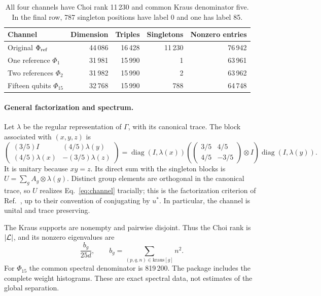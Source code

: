 \documentclass[11pt]{article}
\begin{document}
\begin{table}[ht]
\centering
\small
\begin{tabular}{@{}lrrrr@{}}
\toprule
Channel & Dimension & Triples & Singletons & Nonzero entries\\
\midrule
Original $\Phi_{\mathrm{ref}}$ & 44\,086 & 16\,428 & 11\,230 & 76\,942\\
One reference $\Phi_1$ & 31\,981 & 15\,990 & 1 & 63\,961\\
Two references $\Phi_2$ & 31\,982 & 15\,990 & 2 & 63\,962\\
Fifteen qubits $\Phi_{15}$ & 32\,768 & 15\,990 & 788 & 64\,748\\
\bottomrule
\end{tabular}
\caption{All four channels have Choi rank 11\,230 and common Kraus denominator five.
In the final row, 787 singleton positions have label 0 and one has label 85.}
\label{tab:instances}
\end{table}

\paragraph{General factorization and spectrum.}
Let $\lambda$ be the regular representation of $\Gamma$, with its canonical trace. The
block associated with $(x,y,z)$ is
\begin{equation}
 \begin{pmatrix}(3/5)I&(4/5)\lambda(y)\\(4/5)\lambda(x)&-(3/5)\lambda(z)\end{pmatrix}
 =\operatorname{diag}(I,\lambda(x))
 \left(\begin{pmatrix}3/5&4/5\\4/5&-3/5\end{pmatrix}\otimes I\right)
 \operatorname{diag}(I,\lambda(y)).\label{eq:unitary-block}
\end{equation}
It is unitary because $xy=z$. Its direct sum with the singleton blocks is
$U=\sum_gA_g\otimes\lambda(g)$. Distinct group elements are orthogonal in the canonical
trace, so $U$ realizes Eq.~\eqref{eq:channel} tracially; this is the factorization
criterion of Ref.~\cite[Theorem~2.2]{hm11}, up to their convention of conjugating by $u^*$. In particular, the channel is unital and trace
preserving.

The Kraus supports are nonempty and pairwise disjoint. Thus the Choi rank is $|\mathcal L|$, and
its nonzero eigenvalues are
\begin{equation}
 \frac{b_g}{25d},\qquad
 b_g=\sum_{(p,q,n)\in\mathrm{kraus}[g]}n^2.
 \label{eq:choi-spectrum}
\end{equation}
For $\Phi_{15}$ the common spectral denominator is 819\,200. The package includes the
complete weight histograms. These are exact spectral data, not estimates of the global
separation.
\end{document}
